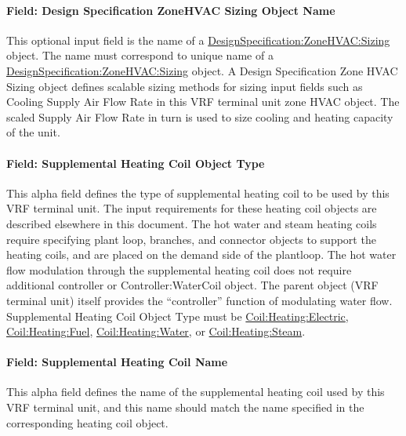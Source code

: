 \paragraph{Field: Design Specification ZoneHVAC Sizing Object Name}\label{field-design-specification-zonehvac-sizing-object-name-9}

This optional input field is the name of a \hyperref[designspecificationzonehvacsizing]{DesignSpecification:ZoneHVAC:Sizing} object. The name must correspond to unique name of a \hyperref[designspecificationzonehvacsizing]{DesignSpecification:ZoneHVAC:Sizing} object. A Design Specification Zone HVAC Sizing object defines scalable sizing methods for sizing input fields such as Cooling Supply Air Flow Rate in this VRF terminal unit zone HVAC object. The scaled Supply Air Flow Rate in turn is used to size cooling and heating capacity of the unit.

\paragraph{Field: Supplemental Heating Coil Object Type}\label{field-supplemental-heating-coil-object-type-2-000}

This alpha field defines the type of supplemental heating coil to be used by this VRF terminal unit. The input requirements for these heating coil objects are described elsewhere in this document. The hot water and steam heating coils require specifying plant loop, branches, and connector objects to support the heating coils, and are placed on the demand side of the plantloop. The hot water flow modulation through the supplemental heating coil does not require additional controller or Controller:WaterCoil object. The parent object (VRF terminal unit) itself provides the “controller” function of modulating water flow. Supplemental Heating Coil Object Type must be \hyperref[coilheatingelectric]{Coil:Heating:Electric}, \hyperref[coilheatinggas-000]{Coil:Heating:Fuel}, \hyperref[coilheatingwater]{Coil:Heating:Water}, or \hyperref[coilheatingsteam]{Coil:Heating:Steam}.

\paragraph{Field: Supplemental Heating Coil Name}\label{field-supplemental-heating-coil-name-2-000}

This alpha field defines the name of the supplemental heating coil used by this VRF terminal unit, and this name should match the name specified in the corresponding heating coil object.

